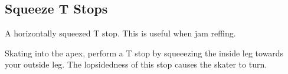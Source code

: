 \subsection*{Squeeze T Stops}
\label{drill:t_stop:squeeze}

A horizontally squeezed T stop. 
This is useful when jam reffing.


Skating into the apex, perform a T stop by squeeezing the inside leg towards your outside leg.  
The lopsidedness of this stop causes the skater to turn.
 

